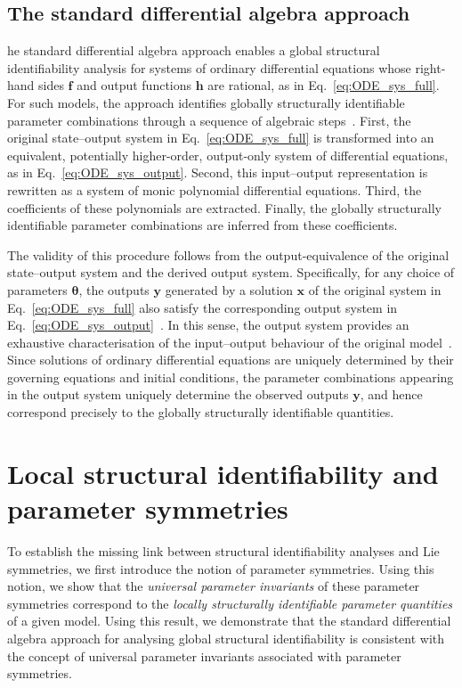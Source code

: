 \documentclass[12pt]{article}
\begin{document}

\subsection{The standard differential algebra approach}

he standard differential algebra approach enables a global structural identifiability analysis for systems of ordinary differential equations whose right-hand sides $\mathbf{f}$ and output functions $\mathbf{h}$ are rational, as in Eq.~\eqref{eq:ODE_sys_full}. For such models, the approach identifies globally structurally identifiable parameter combinations through a sequence of algebraic steps~\cite{renardy2022structural}. First, the original state–output system in Eq.~\eqref{eq:ODE_sys_full} is transformed into an equivalent, potentially higher-order, output-only system of differential equations, as in Eq.~\eqref{eq:ODE_sys_output}. Second, this input–output representation is rewritten as a system of monic polynomial differential equations. Third, the coefficients of these polynomials are extracted. Finally, the globally structurally identifiable parameter combinations are inferred from these coefficients.



The validity of this procedure follows from the output-equivalence of the original state–output system and the derived output system. Specifically, for any choice of parameters $\boldsymbol{\theta}$, the outputs $\mathbf{y}$ generated by a solution $\mathbf{x}$ of the original system in Eq.~\eqref{eq:ODE_sys_full} also satisfy the corresponding output system in Eq.~\eqref{eq:ODE_sys_output}~\cite{audoly2001global}. In this sense, the output system provides an exhaustive characterisation of the input–output behaviour of the original model~\cite{audoly2001global}. Since solutions of ordinary differential equations are uniquely determined by their governing equations and initial conditions, the parameter combinations appearing in the output system uniquely determine the observed outputs $\mathbf{y}$, and hence correspond precisely to the globally structurally identifiable quantities.



\section{Local structural identifiability and parameter symmetries}

To establish the missing link between structural identifiability analyses and Lie symmetries, we first introduce the notion of parameter symmetries. Using this notion, we show that the \emph{universal parameter invariants} of these parameter symmetries correspond to the \emph{locally structurally identifiable parameter quantities} of a given model. Using this result, we demonstrate that the standard differential algebra approach for analysing global structural identifiability is consistent with the concept of universal parameter invariants associated with parameter symmetries.
\end{document}
